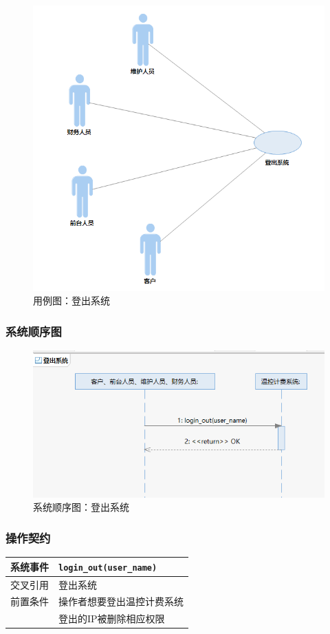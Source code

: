 \documentclass[blue,normal,cn]{elegantnote}
\newcommand{\code}[1]{\colorbox{light-gray}{\texttt{#1}}}
\begin{document}
\begin{figure}[H]
    \centering
    \includegraphics[width=.5\textwidth]{fig/276009.png}
    \caption{用例图：登出系统}
    \label{fig:276009}
\end{figure}

\subsubsection{系统顺序图}

\begin{figure}[H]
    \centering
    \includegraphics[width=.8\textwidth]{fig/276010.png}
    \caption{系统顺序图：登出系统}
    \label{fig:276010}
\end{figure}

\subsubsection{操作契约}

\begin{center}
    \begin{tabular}{|>{\centering}m{}|m{}|}
        \hline
        系统事件                  & \multicolumn{1}{l|}{\code{login\_out(user\_name)}} \\
        \hline
        交叉引用                  & 登出系统                                           \\
        \hline
        前置条件                  & 操作者想要登出温控计费系统                         \\
        \hline
        \multirow{1}{*}{后置条件} & 登出的IP被删除相应权限                             \\
        \hline
    \end{tabular}
\end{center}
\end{document}
